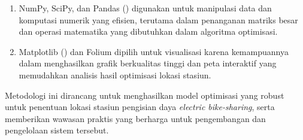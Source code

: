 \begin{enumerate}
\begin{enumerate}
        \item NumPy, SciPy, dan Pandas () digunakan untuk manipulasi data dan komputasi numerik yang efisien, terutama dalam penanganan matriks besar dan operasi matematika yang dibutuhkan dalam algoritma optimisasi.
        
        \item Matplotlib () dan Folium dipilih untuk visualisasi karena kemampuannya dalam menghasilkan grafik berkualitas tinggi dan peta interaktif yang memudahkan analisis hasil optimisasi lokasi stasiun.
    \end{enumerate}
    
    
\end{enumerate}
Metodologi ini dirancang untuk menghasilkan model optimisasi yang robust untuk penentuan lokasi stasiun pengisian daya \textit{electric bike-sharing}, serta memberikan wawasan praktis yang berharga untuk pengembangan dan pengelolaan sistem tersebut.

